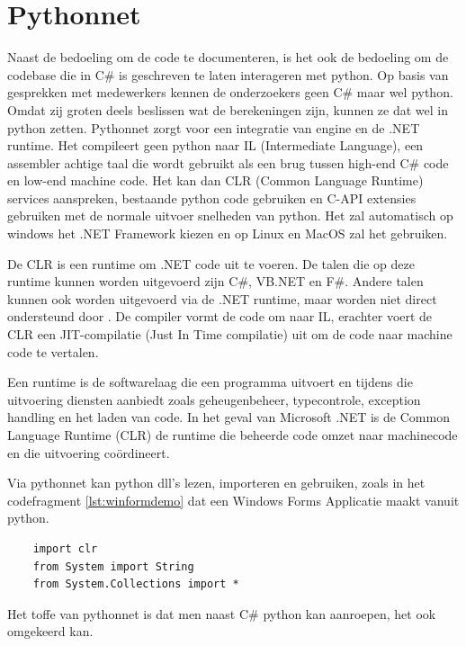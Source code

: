 \section{Pythonnet}
Naast de bedoeling om de code te documenteren, is het ook de bedoeling om de codebase die in C\# is geschreven te laten interageren met python.
Op basis van gesprekken met medewerkers kennen de onderzoekers geen C\# maar wel python. Omdat zij groten deels beslissen wat de berekeningen zijn, kunnen ze dat wel in python zetten.
Pythonnet zorgt voor een integratie van \textcite{Cpython} engine en de .NET runtime.
Het compileert geen python naar IL (Intermediate Language), een assembler achtige taal die wordt gebruikt als een brug tussen high-end C\# code en low-end machine code.
Het kan dan CLR (Common Language Runtime) services aanspreken, bestaande python code gebruiken en C-API extensies gebruiken met de normale uitvoer snelheden van python.
Het zal automatisch op windows het .NET Framework kiezen en op Linux en MacOS zal het \textcite{MonoProject} gebruiken.

De CLR \autocite{clr} is een runtime om .NET code uit te voeren. De talen die op deze runtime kunnen worden uitgevoerd zijn C\#, VB.NET en F\#.
Andere talen kunnen ook worden uitgevoerd via de .NET runtime, maar worden niet direct ondersteund door \textcite{clr}.
De compiler vormt de code om naar IL, erachter voert de CLR een JIT-compilatie (Just In Time compilatie) uit om de code naar machine code te vertalen.

Een runtime is de softwarelaag die een programma uitvoert en tijdens die uitvoering diensten aanbiedt zoals geheugenbeheer, typecontrole, exception handling en het laden van code.
In het geval van Microsoft .NET is de Common Language Runtime (CLR) de runtime die beheerde code omzet naar machinecode en die uitvoering coördineert. \autocite{clr}

Via pythonnet \autocite{pythonnet} kan python dll's lezen, importeren en gebruiken, zoals in het codefragment \ref{lst:winformdemo} dat een Windows Forms Applicatie maakt vanuit python.

\begin{listing}
	\begin{verbatim}
    import clr
    from System import String
    from System.Collections import *
  \end{verbatim}
	\caption[pythonnet officeel codefragment]{Codefragment van de website}\label{lst:winformdemo}
\end{listing}
Het toffe van pythonnet is dat men naast C\# python kan aanroepen, het ook omgekeerd kan.

